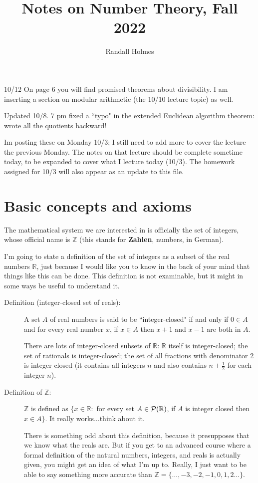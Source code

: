 \documentclass[12pt]{article}
\title{Notes on Number Theory, Fall 2022}
\author{Randall Holmes}
\begin{document}
\maketitle

10/12  On page 6 you will find promised theorems about divisibility.  I am inserting a section on modular arithmetic (the 10/10 lecture topic) as well.

Updated 10/8.  7 pm fixed a ``typo" in the extended Euclidean algorithm theorem:  wrote all the quotients backward!

Im posting these on Monday 10/3;  I still need to add more to cover the lecture the previous Monday.  The notes
on that lecture should be complete sometime today, to be expanded to cover what I lecture today (10/3).  The homework assigned for 10/3 will also appear as an update to this file.



\tableofcontents

\section{Basic concepts and axioms}

The mathematical system we are interested in is officially the set of integers, whose official name is $\mathbb Z$ (this stands for {\bf Zahlen}, numbers, in German).

I'm going to state a definition of the set of integers as a subset of the real numbers $\mathbb R$, just because I would like you to know in the back of your mind that things like this can be done.  This definition is not examinable, but it might in some ways be useful to understand it.

\begin{description}

\item[Definition (integer-closed set of reals):]  A set $A$ of real numbers is said to be ``integer-closed" if and only if $0 \in A$ and for every real number $x$, if $x \in A$ then $x+1$ and $x-1$ are both in $A$.

There are lots of integer-closed subsets of $\mathbb R$:  $\mathbb R$ itself is integer-closed;  the set of rationals is integer-closed; the set of all fractions with denominator 2 is integer closed (it contains all integers $n$ and also contains $n + \frac 12$ for each integer $n$).

\item[Definition of $\mathbb Z$:]  $\mathbb Z$ is defined as $\{x \in \mathbb R:$ for every set $A\in {\cal P}(\mathbb R)$, if $A$ is integer closed then $x \in A\}$.  It really works...think about it.

There is something odd about this definition, because it presupposes that we know what the reals are.  But if you get to an advanced course where a formal definition of the natural numbers, integers, and reals is actually given, you might get an idea of what I'm up to.  Really, I just want to be able to say something more accurate than $\mathbb Z = \{\ldots,-3,-2,-1,0,1,2\ldots\}$.

\end{description}
\end{document}
